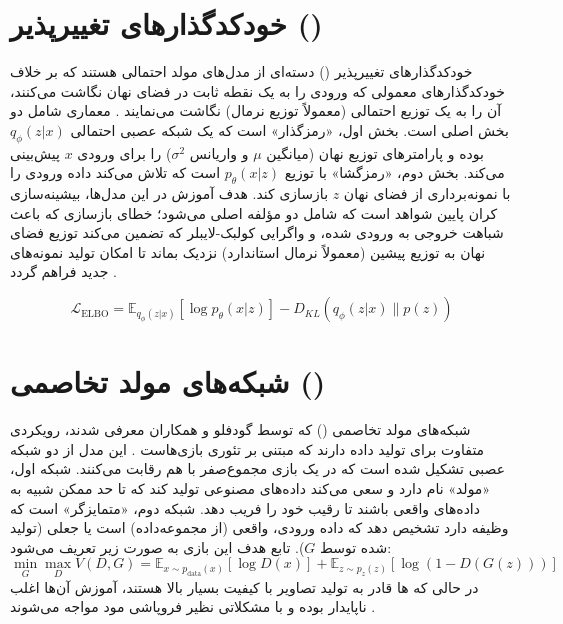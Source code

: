 \section{خودکدگذارهای تغییرپذیر ()}
\label{sec:ch1-vae}
خودکدگذارهای تغییرپذیر 
()
 دسته‌ای از مدل‌های مولد احتمالی هستند که بر خلاف خودکدگذارهای معمولی که ورودی را به یک نقطه ثابت در فضای نهان نگاشت می‌کنند، آن را به یک توزیع احتمالی (معمولاً توزیع نرمال) نگاشت می‌نمایند \cite{Kingma2013}.
معماری  شامل دو بخش اصلی است. بخش اول، «رمزگذار» است که یک شبکه عصبی احتمالی $q_\phi(z|x)$ بوده و پارامترهای توزیع نهان (میانگین $\mu$ و واریانس $\sigma^2$) را برای ورودی $x$ پیش‌بینی می‌کند. بخش دوم، «رمزگشا» با توزیع $p_\theta(x|z)$ است که تلاش می‌کند داده ورودی را با نمونه‌برداری از فضای نهان $z$ بازسازی کند. هدف آموزش در این مدل‌ها، بیشینه‌سازی کران پایین شواهد است که شامل دو مؤلفه اصلی می‌شود؛ خطای بازسازی که باعث شباهت خروجی به ورودی شده، و واگرایی کولبک-لایبلر که تضمین می‌کند توزیع فضای نهان به توزیع پیشین (معمولاً نرمال استاندارد) نزدیک بماند تا امکان تولید نمونه‌های جدید فراهم گردد \cite{Kingma2013}.

\begin{equation}
    \mathcal{L}_{\text{ELBO}} = \mathbb{E}_{q_\phi(z|x)}[\log p_\theta(x|z)] - D_{KL}(q_\phi(z|x) \| p(z))
\end{equation}

\section{شبکه‌های مولد تخاصمی ()}
\label{sec:ch1-gan}
شبکه‌های مولد تخاصمی () که توسط گودفلو و همکاران معرفی شدند، رویکردی متفاوت برای تولید داده دارند که مبتنی بر تئوری بازی‌هاست \cite{Goodfellow2014}. این مدل از دو شبکه عصبی تشکیل شده است که در یک بازی مجموع‌صفر با هم رقابت می‌کنند. شبکه اول، «مولد» نام دارد و سعی می‌کند داده‌های مصنوعی تولید کند که تا حد ممکن شبیه به داده‌های واقعی باشند تا رقیب خود را فریب دهد. شبکه دوم، «متمایزگر» است که وظیفه دارد تشخیص دهد که داده ورودی، واقعی (از مجموعه‌داده) است یا جعلی (تولید شده توسط $G$). تابع هدف این بازی به صورت زیر تعریف می‌شود:
\begin{equation}
    \min_G \max_D V(D, G) = \mathbb{E}_{x \sim p_{\text{data}}(x)}[\log D(x)] + \mathbb{E}_{z \sim p_{z}(z)}[\log(1 - D(G(z)))]
\end{equation}
در حالی که ها قادر به تولید تصاویر با کیفیت بسیار بالا هستند، آموزش آن‌ها اغلب ناپایدار بوده و با مشکلاتی نظیر فروپاشی مود مواجه می‌شوند \cite{Goodfellow2014,8567753}.

